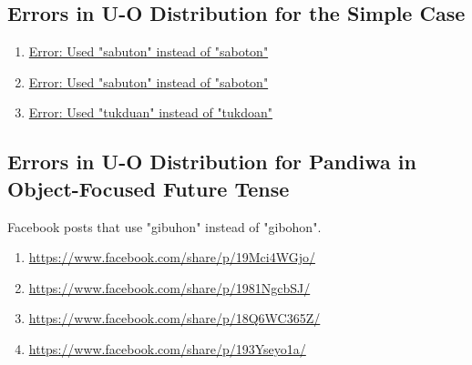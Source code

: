 \subsection{Errors in U-O Distribution for the Simple Case}
\begin{enumerate}
    \item \href{https://www.facebook.com/share/p/1DCJL8KWLr/}{Error: Used "sabuton" instead of "saboton"}
    \item \href{https://www.facebook.com/share/p/1BQBPKzNNE/}{Error: Used "sabuton" instead of "saboton"}
    \item \href{https://www.facebook.com/share/p/163t1N1x1b/}{Error: Used "tukduan" instead of "tukdoan"}
\end{enumerate}

\subsection{Errors in U-O Distribution for Pandiwa in Object-Focused Future Tense}
Facebook posts that use "gibuhon" instead of "gibohon".
\begin{enumerate}
    \item \url{https://www.facebook.com/share/p/19Mci4WGjo/}
    \item \url{https://www.facebook.com/share/p/1981NgcbSJ/}
    \item \url{https://www.facebook.com/share/p/18Q6WC365Z/}
    \item \url{https://www.facebook.com/share/p/193Yseyo1a/}
\end{enumerate}
